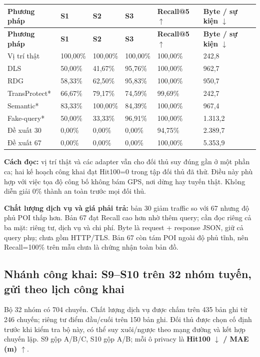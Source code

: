 \documentclass[10pt,a4paper]{article}
\begin{document}
\begingroup\small
\begin{longtable}{@{}P{3.425cm}P{1.998cm}P{1.998cm}P{1.998cm}P{2.854cm}P{3.520cm}@{}}
\toprule
\textbf{Phương pháp} & \textbf{S1} & \textbf{S2} & \textbf{S3} & \textbf{Recall@5 $\uparrow$} & \textbf{Byte / sự kiện $\downarrow$}\\\midrule
\endfirsthead
\toprule
\textbf{Phương pháp} & \textbf{S1} & \textbf{S2} & \textbf{S3} & \textbf{Recall@5 $\uparrow$} & \textbf{Byte / sự kiện $\downarrow$}\\\midrule
\endhead
\bottomrule\endfoot
Vị trí thật & 100,00\% & 100,00\% & 100,00\% & 100,00\% & 242,8\\
\addlinespace[3pt]
DLS & 50,00\% & 41,67\% & 95,76\% & 100,00\% & 962,7\\
\addlinespace[3pt]
RDG & 58,33\% & 62,50\% & 95,83\% & 100,00\% & 950,7\\
\addlinespace[3pt]
TransProtect* & 66,67\% & 79,17\% & 74,59\% & 99,69\% & 242,7\\
\addlinespace[3pt]
Semantic* & 83,33\% & 100,00\% & 84,39\% & 100,00\% & 967,4\\
\addlinespace[3pt]
Fake-query* & 50,00\% & 33,33\% & 96,91\% & 100,00\% & 1.313,2\\
\addlinespace[3pt]
Đề xuất 30 & 0,00\% & 0,00\% & 0,00\% & 94,75\% & 2.389,7\\
\addlinespace[3pt]
Đề xuất 67 & 0,00\% & 0,00\% & 0,00\% & 100,00\% & 5.353,9\\
\end{longtable}
\endgroup
\textbf{Cách đọc:} vị trí thật và các adapter vẫn cho đối thủ suy đúng gần ở một phần ca; hai kế hoạch công khai đạt Hit100=0 trong tập đối thủ đã thử. Điều này phù hợp với việc tọa độ công bố không bám GPS, nơi dừng hay tuyến thật. Không diễn giải 0\% thành an toàn trước mọi đối thủ.

\textbf{Chất lượng dịch vụ và giá phải trả:} bản 30 giảm traffic so với 67 nhưng độ phủ POI thấp hơn. Bản 67 đạt Recall cao hơn nhờ thêm query; cần đọc riêng cả ba mặt: riêng tư, dịch vụ và chi phí. Byte là request + response JSON, giữ cả query phụ; chưa gồm HTTP/TLS. Bản 67 còn tám POI ngoài độ phủ tĩnh, nên Recall=100\% trên mẫu chưa là chứng nhận toàn bản đồ.


\clearpage
\subsection{Nhánh công khai: S9–S10 trên 32 nhóm tuyến, gửi theo lịch công khai}\label{sub:3.2}
Bộ 32 nhóm có 704 chuyến. Chất lượng dịch vụ được chấm trên 435 bản ghi từ 246 chuyến; riêng tư điểm đầu/cuối trên 150 bản ghi. Đối thủ được chọn cố định trước khi kiểm tra bộ này, có thể suy xuôi/ngược theo mạng đường và kết hợp chuyến lặp. S9 gộp A/B/C, S10 gộp A/B; mỗi ô privacy là \textbf{Hit100 $\downarrow$ / MAE (m) $\uparrow$}.
\end{document}
